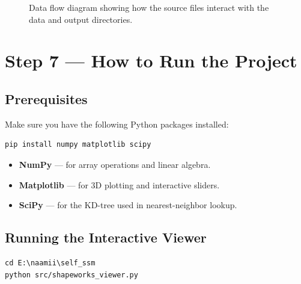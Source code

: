 \documentclass[12pt,a4paper]{article}
\begin{document}
\begin{figure}[H]
    \centering
    \caption{Data flow diagram showing how the source files interact with the data and output directories.}
    \label{fig:project_structure}
\end{figure}

\section{Step 7 --- How to Run the Project}

\subsection{Prerequisites}

Make sure you have the following Python packages installed:

\begin{lstlisting}[title={\textbf{Required packages}}]
pip install numpy matplotlib scipy
\end{lstlisting}

\begin{itemize}
    \item \textbf{NumPy} --- for array operations and linear algebra.
    \item \textbf{Matplotlib} --- for 3D plotting and interactive sliders.
    \item \textbf{SciPy} --- for the KD-tree used in nearest-neighbor lookup.
\end{itemize}

\subsection{Running the Interactive Viewer}

\begin{lstlisting}[title={\textbf{Launch the interactive viewer}}]
cd E:\naamii\self_ssm
python src/shapeworks_viewer.py
\end{lstlisting}
\end{document}
